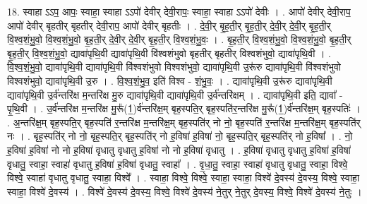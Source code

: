 \documentclass[17pt]{extarticle}
\begin{document}
18. स्वाहा ऽऽप॒ आपः॒ स्वाहा॒ स्वाहा ऽऽपो॑ देवीर् देवी॒रापः॒ स्वाहा॒ स्वाहा ऽऽपो॑ देवीः । . आपो॑ देवीर् देवी॒राप॒ आपो॑ देवीर् बृहतीर् बृहतीर् देवी॒राप॒ आपो॑ देवीर् बृहतीः । . दे॒वी॒र् बृ॒ह॒ती॒र् बृ॒ह॒ती॒र् दे॒वी॒र् दे॒वी॒र् बृ॒ह॒ती॒र् वि॒श्व॒शं॒भु॒वो॒ वि॒श्व॒शं॒भु॒वो॒ बृ॒ह॒ती॒र् दे॒वी॒र् दे॒वी॒र् बृ॒ह॒ती॒र् वि॒श्व॒शं॒भु॒वः॒ । . बृ॒ह॒ती॒र् वि॒श्व॒शं॒भु॒वो॒ वि॒श्व॒शं॒भु॒वो॒ बृ॒ह॒ती॒र् बृ॒ह॒ती॒र् वि॒श्व॒शं॒भु॒वो॒ द्यावा॑पृथि॒वी द्यावा॑पृथि॒वी वि॑श्वशंभुवो बृहतीर् बृहतीर् विश्वशंभुवो॒ द्यावा॑पृथि॒वी । . वि॒श्व॒शं॒भु॒वो॒ द्यावा॑पृथि॒वी द्यावा॑पृथि॒वी वि॑श्वशंभुवो विश्वशंभुवो॒ द्यावा॑पृथि॒वी उ॒रू॑रु द्यावा॑पृथि॒वी वि॑श्वशंभुवो विश्वशंभुवो॒ द्यावा॑पृथि॒वी उ॒रु । . वि॒श्व॒शं॒भु॒व॒ इति॑ विश्व - शं॒भु॒वः॒ । . द्यावा॑पृथि॒वी उ॒रू॑रु द्यावा॑पृथि॒वी द्यावा॑पृथि॒वी उ॒र्व॑न्तरि॑क्ष म॒न्तरि॑क्ष मु॒रु द्यावा॑पृथि॒वी द्यावा॑पृथि॒वी उ॒र्व॑न्तरि॑क्षम् । . द्यावा॑पृथि॒वी इति॒ द्यावा᳚ - पृ॒थि॒वी । . उ॒र्व॑न्तरि॑क्ष म॒न्तरि॑क्ष मु॒रू᳚(1॒)र्व॑न्तरि॑क्ष॒म् बृह॒स्पति॒र् बृह॒स्पति॑र॒न्तरि॑क्ष मु॒रू᳚(1॒)र्व॑न्तरि॑क्ष॒म् बृह॒स्पतिः॑ । . अ॒न्तरि॑क्ष॒म् बृह॒स्पति॒र् बृह॒स्पति॑ र॒न्तरि॑क्ष म॒न्तरि॑क्ष॒म् बृह॒स्पति॑र् नो नो॒ बृह॒स्पति॑ र॒न्तरि॑क्ष म॒न्तरि॑क्ष॒म् बृह॒स्पति॑र् नः । . बृह॒स्पति॑र् नो नो॒ बृह॒स्पति॒र् बृह॒स्पति॑र् नो ह॒विषा॑ ह॒विषा॑ नो॒ बृह॒स्पति॒र् बृह॒स्पति॑र् नो ह॒विषा᳚ । . नो॒ ह॒विषा॑ ह॒विषा॑ नो नो ह॒विषा॑ वृधातु वृधातु ह॒विषा॑ नो नो ह॒विषा॑ वृधातु । . ह॒विषा॑ वृधातु वृधातु ह॒विषा॑ ह॒विषा॑ वृधातु॒ स्वाहा॒ स्वाहा॑ वृधातु ह॒विषा॑ ह॒विषा॑ वृधातु॒ स्वाहा᳚ । . वृ॒धा॒तु॒ स्वाहा॒ स्वाहा॑ वृधातु वृधातु॒ स्वाहा॒ विश्वे॒ विश्वे॒ स्वाहा॑ वृधातु वृधातु॒ स्वाहा॒ विश्वे᳚ । . स्वाहा॒ विश्वे॒ विश्वे॒ स्वाहा॒ स्वाहा॒ विश्वे॑ दे॒वस्य॑ दे॒वस्य॒ विश्वे॒ स्वाहा॒ स्वाहा॒ विश्वे॑ दे॒वस्य॑ । . विश्वे॑ दे॒वस्य॑ दे॒वस्य॒ विश्वे॒ विश्वे॑ दे॒वस्य॑ ने॒तुर् ने॒तुर् दे॒वस्य॒ विश्वे॒ विश्वे॑ दे॒वस्य॑ ने॒तुः । \newline
\end{document}
